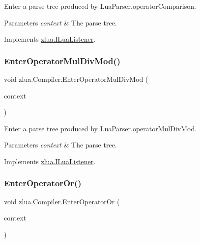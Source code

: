 Enter a parse tree produced by Lua\+Parser.\+operator\+Comparison. 


\begin{DoxyParams}{Parameters}
{\em context} & The parse tree.\\
\hline
\end{DoxyParams}


Implements \mbox{\hyperlink{interfacezlua_1_1_i_lua_listener_a5af42c94cc987459977c34f85b037120}{zlua.\+I\+Lua\+Listener}}.

\mbox{\label{classzlua_1_1_compiler_a59d6144f868523b34a542792c6dfafa2}} 
\subsubsection{\texorpdfstring{Enter\+Operator\+Mul\+Div\+Mod()}{EnterOperatorMulDivMod()}}
{\footnotesize\ttfamily void zlua.\+Compiler.\+Enter\+Operator\+Mul\+Div\+Mod (\begin{DoxyParamCaption}\item[{\mbox{[}\+Not\+Null\mbox{]} \mbox{\hyperlink{classzlua_1_1_lua_parser_1_1_operator_mul_div_mod_context}{Lua\+Parser.\+Operator\+Mul\+Div\+Mod\+Context}}}]{context }\end{DoxyParamCaption})}



Enter a parse tree produced by Lua\+Parser.\+operator\+Mul\+Div\+Mod. 


\begin{DoxyParams}{Parameters}
{\em context} & The parse tree.\\
\hline
\end{DoxyParams}


Implements \mbox{\hyperlink{interfacezlua_1_1_i_lua_listener_ab6bb494a78b26f8483ef9d872c82c8d6}{zlua.\+I\+Lua\+Listener}}.

\mbox{\label{classzlua_1_1_compiler_a75f93e717dd16160d39907f826257579}} 
\subsubsection{\texorpdfstring{Enter\+Operator\+Or()}{EnterOperatorOr()}}
{\footnotesize\ttfamily void zlua.\+Compiler.\+Enter\+Operator\+Or (\begin{DoxyParamCaption}\item[{\mbox{[}\+Not\+Null\mbox{]} \mbox{\hyperlink{classzlua_1_1_lua_parser_1_1_operator_or_context}{Lua\+Parser.\+Operator\+Or\+Context}}}]{context }\end{DoxyParamCaption})}



